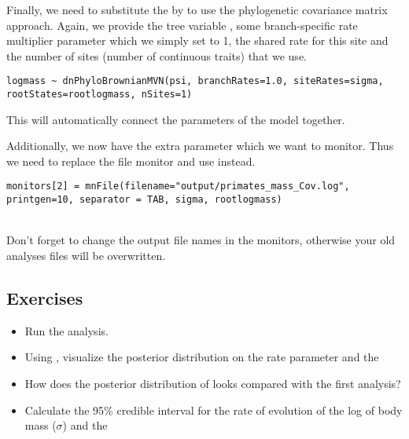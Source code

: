 Finally, we need to substitute the  by  to use the phylogenetic covariance matrix approach.
Again, we provide the tree variable , some branch-specific rate multiplier parameter which we simply set to 1, the shared rate for this site  and the number of sites (number of continuous traits) that we use. 
{\tt \small \begin{snugshade*}
\begin{lstlisting}
logmass ~ dnPhyloBrownianMVN(psi, branchRates=1.0, siteRates=sigma, rootStates=rootlogmass, nSites=1)
\end{lstlisting}
\end{snugshade*}}
This will automatically connect the parameters of the model together.

Additionally, we now have the extra parameter  which we want to monitor.
Thus we need to replace the file monitor and use instead.
{\tt \small \begin{snugshade*}
\begin{lstlisting}
monitors[2] = mnFile(filename="output/primates_mass_Cov.log", printgen=10, separator = TAB, sigma, rootlogmass)
\end{lstlisting}
\end{snugshade*}}


\noindent \\ \impmark Don't forget to change the output file names in the monitors, otherwise your old analyses files will be overwritten.


\subsection*{Exercises}

\begin{itemize}
\item
Run the analysis.
\item
Using , visualize the posterior distribution on the rate parameter  and the 
\item 
How does the posterior distribution of  looks compared with the first analysis?
\item
Calculate the 95\% credible interval for the rate of evolution of the log of body mass ($\sigma$) and the 
\end{itemize}

\vspace{5cm}








